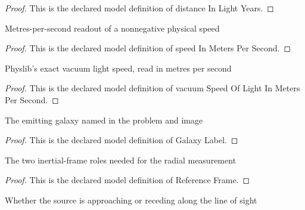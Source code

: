 \begin{proof}
  This is the declared model definition of distance In Light Years.
\end{proof}
\begin{definition}
  \label{def:physics:phyx-mini-0596:phyxminiproblems-problemphyxmini0596-speedinmeterspersecond}
  Metres-per-second readout of a nonnegative physical speed
\end{definition}
\begin{proof}
  This is the declared model definition of speed In Meters Per Second.
\end{proof}
\begin{definition}
  \label{def:physics:phyx-mini-0596:phyxminiproblems-problemphyxmini0596-vacuumspeedoflightinmeterspersecond}
  Physlib's exact vacuum light speed, read in metres per second
\end{definition}
\begin{proof}
  This is the declared model definition of vacuum Speed Of Light In Meters Per Second.
\end{proof}
\begin{definition}
  \label{def:physics:phyx-mini-0596:phyxminiproblems-problemphyxmini0596-galaxylabel}
  The emitting galaxy named in the problem and image
\end{definition}
\begin{proof}
  This is the declared model definition of Galaxy Label.
\end{proof}
\begin{definition}
  \label{def:physics:phyx-mini-0596:phyxminiproblems-problemphyxmini0596-referenceframe}
  The two inertial-frame roles needed for the radial measurement
\end{definition}
\begin{proof}
  This is the declared model definition of Reference Frame.
\end{proof}
\begin{definition}
  \label{def:physics:phyx-mini-0596:phyxminiproblems-problemphyxmini0596-radialdirection}
  Whether the source is approaching or receding along the line of sight
\end{definition}
